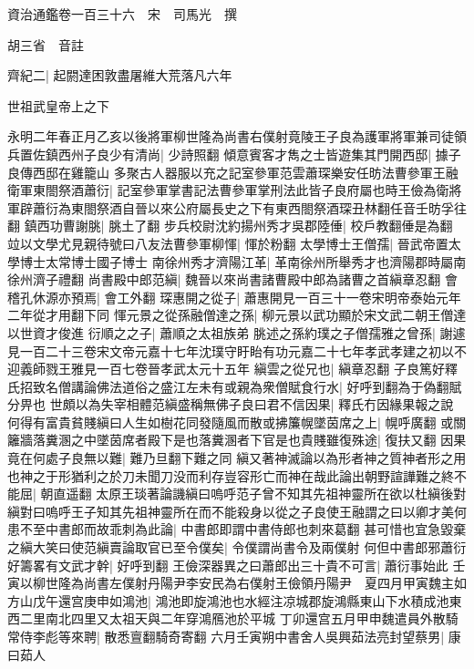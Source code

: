 資治通鑑卷一百三十六　宋　司馬光　撰

胡三省　音註

齊紀二|{
	起閼達困敦盡屠維大荒落凡六年}


世祖武皇帝上之下

永明二年春正月乙亥以後將軍柳世隆為尚書右僕射竟陵王子良為護軍將軍兼司徒領兵置佐鎮西州子良少有清尚|{
	少詩照翻}
傾意賓客才雋之士皆遊集其門開西邸|{
	據子良傳西邸在雞籠山}
多聚古人器服以充之記室參軍范雲蕭琛樂安任昉法曹參軍王融衛軍東閤祭酒蕭衍|{
	記室參軍掌書記法曹參軍掌刑法此皆子良府屬也時王儉為衛將軍辟蕭衍為東閤祭酒自晉以來公府屬長史之下有東西閤祭酒琛丑林翻任音壬昉孚往翻}
鎮西功曹謝朓|{
	朓土了翻}
步兵校尉沈約揚州秀才吳郡陸倕|{
	校戶教翻倕是為翻}
竝以文學尤見親待號曰八友法曹參軍柳惲|{
	惲於粉翻}
太學博士王僧孺|{
	晉武帝置太學博士太常博士國子博士}
南徐州秀才濟陽江革|{
	革南徐州所舉秀才也濟陽郡時屬南徐州濟子禮翻}
尚書殿中郎范縝|{
	魏晉以來尚書諸曹殿中郎為諸曹之首縝章忍翻}
會稽孔休源亦預焉|{
	會工外翻}
琛惠開之從子|{
	蕭惠開見一百三十一卷宋明帝泰始元年二年從才用翻下同}
惲元景之從孫融僧達之孫|{
	柳元景以武功顯於宋文武二朝王僧達以世資才俊進}
衍順之之子|{
	蕭順之太祖族弟}
朓述之孫約璞之子僧孺雅之曾孫|{
	謝遽見一百二十三卷宋文帝元嘉十七年沈璞守盱眙有功元嘉二十七年孝武孝建之初以不迎義師戮王雅見一百七卷晉孝武太元十五年}
縝雲之從兄也|{
	縝章忍翻}
子良篤好釋氏招致名僧講論佛法道俗之盛江左未有或親為衆僧賦食行水|{
	好呼到翻為于偽翻賦分畀也}
世頗以為失宰相體范縝盛稱無佛子良曰君不信因果|{
	釋氏冇因緣果報之說}
何得有富貴貧賤縝曰人生如樹花同發隨風而散或拂簾幌墜茵席之上|{
	幌呼廣翻}
或關籬牆落糞溷之中墜茵席者殿下是也落糞溷者下官是也貴賤雖復殊途|{
	復扶又翻}
因果竟在何處子良無以難|{
	難乃旦翻下難之同}
縝又著神滅論以為形者神之質神者形之用也神之于形猶利之於刀未聞刀没而利存豈容形亡而神在哉此論出朝野諠譁難之終不能屈|{
	朝直遥翻}
太原王琰著論譏縝曰嗚呼范子曾不知其先祖神靈所在欲以杜縝後對縝對曰嗚呼王子知其先祖神靈所在而不能殺身以從之子良使王融謂之曰以卿才美何患不至中書郎而故乖刺為此論|{
	中書郎即謂中書侍郎也刺來葛翻}
甚可惜也宜急毀棄之縝大笑曰使范縝賣論取官已至令僕矣|{
	令僕謂尚書令及兩僕射}
何但中書郎邪蕭衍好籌畧有文武才幹|{
	好呼到翻}
王儉深器異之曰蕭郎出三十貴不可言|{
	蕭衍事始此}
壬寅以柳世隆為尚書左僕射丹陽尹李安民為右僕射王儉領丹陽尹　夏四月甲寅魏主如方山戊午還宫庚申如鴻池|{
	鴻池即旋鴻池也水經注凉城郡旋鴻縣東山下水積成池東西二里南北四里又太祖天與二年穿鴻鴈池於平城}
丁卯還宫五月甲申魏遣員外散騎常侍李彪等來聘|{
	散悉亶翻騎奇寄翻}
六月壬寅朔中書舍人吳興茹法亮封望蔡男|{
	康曰茹人}


